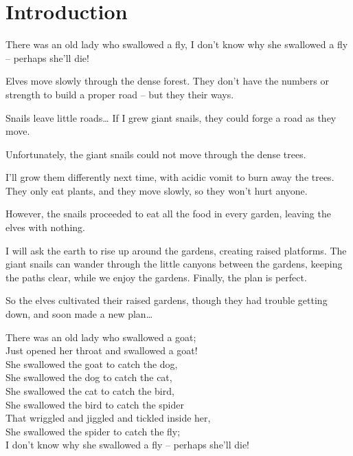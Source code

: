 \section{Introduction}

\begin{exampletext}
  There was an old lady who swallowed a fly,
  I don't know why she swallowed a fly – perhaps she'll die!
\end{exampletext}

Elves move slowly through the dense forest.
They don't have the numbers or strength to build a proper road -- but they their ways.

\begin{exampletext}
  Snails leave little roads\ldots
  If I grew giant snails, they could forge a road as they move.
\end{exampletext}

Unfortunately, the giant snails could not move through the dense trees.

\begin{exampletext}
  I'll grow them differently next time, with acidic vomit to burn away the trees.
  They only eat plants, and they move slowly, so they won't hurt anyone.
\end{exampletext}

However, the snails proceeded to eat all the food in every garden, leaving the elves with nothing.

\begin{exampletext}
  I will ask the earth to rise up around the gardens, creating raised platforms.
  The giant snails can wander through the little canyons between the gardens, keeping the paths clear, while we enjoy the gardens.
  Finally, the plan is perfect.
\end{exampletext}

So the elves cultivated their raised gardens, though they had trouble getting down, and soon made a new plan\ldots

\begin{exampletext}
  \noindent
  There was an old lady who swallowed a goat; \\
  Just opened her throat and swallowed a goat! \\
  She swallowed the goat to catch the dog, \\
  She swallowed the dog to catch the cat, \\
  She swallowed the cat to catch the bird, \\
  She swallowed the bird to catch the spider \\
  That wriggled and jiggled and tickled inside her, \\
  She swallowed the spider to catch the fly; \\
  I don't know why she swallowed a fly – perhaps she'll die! \\
\end{exampletext}

